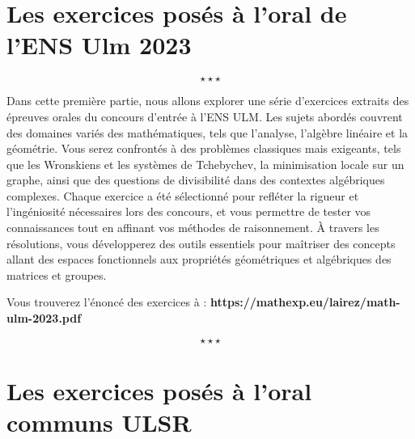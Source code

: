 \documentclass[a4paper,11pt]{article}
\newcounter{exercice}
\begin{document}


\renewcommand{\headrulewidth}{0.4pt}

\newpage
\part{Les exercices pos{\'e}s {\`a} l'oral de l'ENS Ulm 2023}
\[ \star \star \star \]
\begin{center}
  Dans cette premi{\`e}re partie, nous allons explorer une s{\'e}rie d'exercices extraits des {\'e}preuves orales du concours d'entr{\'e}e {\`a} l'ENS ULM. Les sujets abord{\'e}s couvrent des domaines vari{\'e}s des math{\'e}matiques, tels que l'analyse, l'alg{\`e}bre lin{\'e}aire et la g{\'e}om{\'e}trie. Vous serez confront{\'e}s {\`a} des probl{\`e}mes classiques mais exigeants, tels que les Wronskiens et les syst{\`e}mes de Tchebychev, la minimisation locale sur un graphe, ainsi que des questions de divisibilit{\'e} dans des contextes alg{\'e}briques complexes. Chaque exercice a {\'e}t{\'e} s{\'e}lectionn{\'e} pour refl{\'e}ter la rigueur et l'ing{\'e}niosit{\'e} n{\'e}cessaires lors des concours, et vous permettre de tester vos connaissances tout en affinant vos m{\'e}thodes de raisonnement. {\`A} travers les r{\'e}solutions, vous d{\'e}velopperez des outils essentiels pour ma{\^i}triser des concepts allant des espaces fonctionnels aux propri{\'e}t{\'e}s g{\'e}om{\'e}triques et alg{\'e}briques des matrices et groupes.
  
  Vous trouverez l'{\'e}nonc{\'e} des exercices {\`a} :
  \textbf{https://mathexp.eu/lairez/math-ulm-2023.pdf}
\end{center}
\[ \star \star \star \]
\newpage




























\newpage
\part{Les exercices pos{\'e}s {\`a} l'oral communs ULSR}
\end{document}
